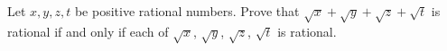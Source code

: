 Let $x,y,z,t$ be positive rational numbers. Prove that $\sqrt x+\sqrt y+\sqrt z+\sqrt t$ is rational if and only if each of $\sqrt x$, $\sqrt y$, $\sqrt z$, $\sqrt t$ is rational.
